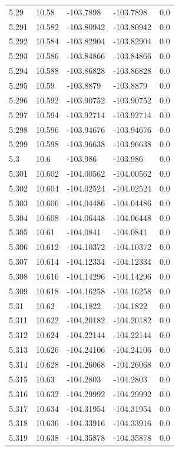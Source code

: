 \begin{tabular}{lllll}
5.29 & 10.58 & -103.7898 & -103.7898 & 0.0 \\
5.291 & 10.582 & -103.80942 & -103.80942 & 0.0 \\
5.292 & 10.584 & -103.82904 & -103.82904 & 0.0 \\
5.293 & 10.586 & -103.84866 & -103.84866 & 0.0 \\
5.294 & 10.588 & -103.86828 & -103.86828 & 0.0 \\
5.295 & 10.59 & -103.8879 & -103.8879 & 0.0 \\
5.296 & 10.592 & -103.90752 & -103.90752 & 0.0 \\
5.297 & 10.594 & -103.92714 & -103.92714 & 0.0 \\
5.298 & 10.596 & -103.94676 & -103.94676 & 0.0 \\
5.299 & 10.598 & -103.96638 & -103.96638 & 0.0 \\
5.3 & 10.6 & -103.986 & -103.986 & 0.0 \\
5.301 & 10.602 & -104.00562 & -104.00562 & 0.0 \\
5.302 & 10.604 & -104.02524 & -104.02524 & 0.0 \\
5.303 & 10.606 & -104.04486 & -104.04486 & 0.0 \\
5.304 & 10.608 & -104.06448 & -104.06448 & 0.0 \\
5.305 & 10.61 & -104.0841 & -104.0841 & 0.0 \\
5.306 & 10.612 & -104.10372 & -104.10372 & 0.0 \\
5.307 & 10.614 & -104.12334 & -104.12334 & 0.0 \\
5.308 & 10.616 & -104.14296 & -104.14296 & 0.0 \\
5.309 & 10.618 & -104.16258 & -104.16258 & 0.0 \\
5.31 & 10.62 & -104.1822 & -104.1822 & 0.0 \\
5.311 & 10.622 & -104.20182 & -104.20182 & 0.0 \\
5.312 & 10.624 & -104.22144 & -104.22144 & 0.0 \\
5.313 & 10.626 & -104.24106 & -104.24106 & 0.0 \\
5.314 & 10.628 & -104.26068 & -104.26068 & 0.0 \\
5.315 & 10.63 & -104.2803 & -104.2803 & 0.0 \\
5.316 & 10.632 & -104.29992 & -104.29992 & 0.0 \\
5.317 & 10.634 & -104.31954 & -104.31954 & 0.0 \\
5.318 & 10.636 & -104.33916 & -104.33916 & 0.0 \\
5.319 & 10.638 & -104.35878 & -104.35878 & 0.0 \\

\end{tabular}
